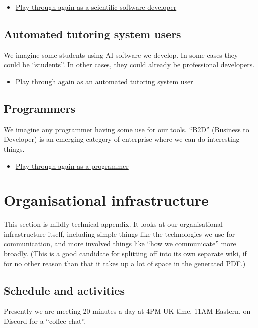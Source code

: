 \documentclass[11pt]{article}
\begin{document}
\begin{itemize}
\item \href{0caba40b-2561-4143-b2b1-55f3ddc3201b}{Play through again as a scientific software developer}
\end{itemize}
\subsection{Automated tutoring system users}
\label{sec:org8f21452}
We imagine some students using AI software we develop.  In some cases
they could be “students”.  In other cases, they could already be
professional developers.

\begin{itemize}
\item \href{0caba40b-2561-4143-b2b1-55f3ddc3201b}{Play through again as an automated tutoring system user}
\end{itemize}
\subsection{Programmers}
\label{sec:org1318b54}
We imagine any programmer having some use for our tools.  “B2D”
(Business to Developer) is an emerging category of enterprise where we
can do interesting things.

\begin{itemize}
\item \href{0caba40b-2561-4143-b2b1-55f3ddc3201b}{Play through again as a programmer}
\end{itemize}
\section{Organisational infrastructure}
\label{sec:orgb556ba5}
This section is mildly-technical appendix.  It looks at our
organisational infrastructure itself, including simple things like the
technologies we use for communication, and more involved things like
“how we communicate” more broadly.  (This is a good candidate for
splitting off into its own separate wiki, if for no other reason than
that it takes up a lot of space in the generated PDF.)

\subsection{Schedule and activities}
\label{sec:org33d716b}

Presently we are meeting 20 minutes a day at 4PM UK time, 11AM
Eastern, on Discord for a “coffee chat”.
\end{document}
